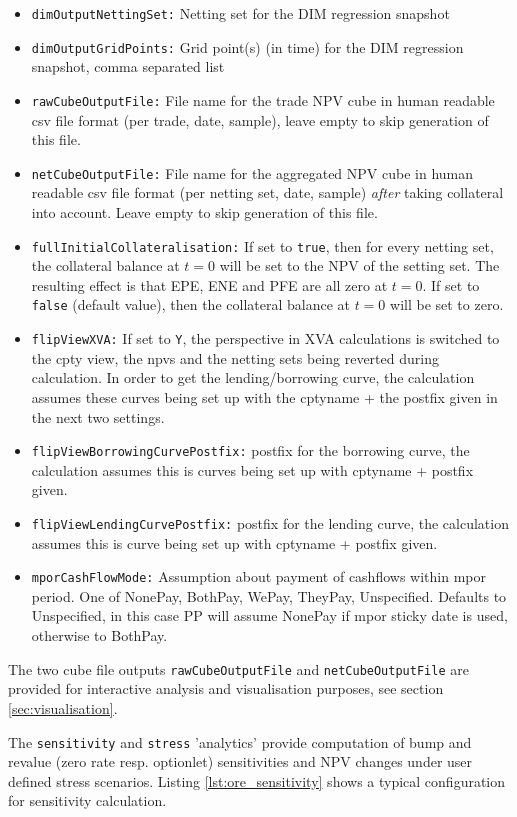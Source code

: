 \documentclass[12pt, a4paper]{article}
\begin{document}
\begin{itemize}
\item {\tt dimOutputNettingSet:} Netting set for the DIM regression snapshot
\item {\tt dimOutputGridPoints:} Grid point(s) (in time) for the DIM regression snapshot, comma separated list
\item {\tt rawCubeOutputFile:} File name for the trade NPV cube in human readable csv file format (per trade, date,
sample), leave empty to skip generation of this file.
\item {\tt netCubeOutputFile:} File name for the aggregated NPV cube in human readable csv file format (per netting set,
date, sample) {\em after} taking collateral into account. Leave empty to skip generation of this file.
\item {\tt fullInitialCollateralisation:} If set to {\tt true}, then for every netting set, the collateral balance at $t=0$ will be set to the NPV of the setting set. The resulting effect is that EPE, ENE and PFE are all zero at $t=0$. If set to {\tt false} (default value), then the collateral balance at $t=0$ will be set to zero.
\item {\tt flipViewXVA:} If set to {\tt Y}, the perspective in XVA calculations is switched to the cpty view, the npvs and the netting sets being reverted during calculation. In order to get the lending/borrowing curve, the calculation assumes these curves being set up with the cptyname + the postfix given in the next two settings.
\item {\tt flipViewBorrowingCurvePostfix:} postfix for the borrowing curve, the calculation assumes this is curves being set up with cptyname + postfix given.
\item {\tt flipViewLendingCurvePostfix:} postfix for the lending curve, the calculation assumes this is curve being set up with cptyname + postfix given.
\item {\tt mporCashFlowMode:} Assumption about payment of cashflows within mpor period. One of NonePay, BothPay, WePay,
  TheyPay, Unspecified. Defaults to Unspecified, in this case PP will assume NonePay if mpor sticky date is used,
  otherwise to BothPay.
\end{itemize}

The two cube file outputs {\tt rawCubeOutputFile} and {\tt netCubeOutputFile} are provided for interactive analysis and visualisation purposes, see section
\ref{sec:visualisation}.

\medskip The {\tt sensitivity} and {\tt stress} 'analytics' provide computation of bump and revalue (zero rate
resp. optionlet) sensitivities and NPV changes under user defined stress scenarios. Listing \ref{lst:ore_sensitivity}
shows a typical configuration for sensitivity calculation.
\end{document}
